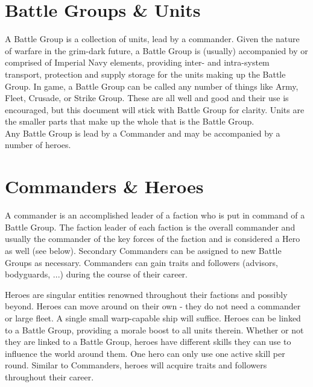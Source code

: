 \section{Battle Groups \& Units}
A Battle Group is a collection of units, lead by a commander. Given the nature of warfare in the grim-dark future, a Battle Group is (usually) accompanied by or comprised of Imperial Navy elements, providing inter- and intra-system transport, protection and supply storage for the units making up the Battle Group.  In game, a Battle Group can be called any number of things like Army, Fleet, Crusade, or Strike Group. 
These are all well and good and their use is encouraged, but this document will stick with Battle Group for clarity.
Units are the smaller parts that make up the whole that is the Battle Group. \\
Any Battle Group is lead by a Commander and may be accompanied by a number of heroes.

\section{Commanders \& Heroes}
A commander is an accomplished leader of a faction who is put in command of a Battle Group. The faction leader of each faction is the overall commander and usually the commander of the key forces of the faction and is considered a Hero as well (see below).
Secondary Commanders can be assigned to new Battle Groups as necessary. Commanders can gain traits and followers (advisors, bodyguards, ...) during the course of their career.

Heroes are singular entities renowned throughout their factions and possibly beyond. Heroes can move around on their own - they do not need a commander or large fleet. A single small warp-capable ship will suffice.
Heroes can be linked to a Battle Group, providing a morale boost to all units therein. 
Whether or not they are linked to a Battle Group, heroes have different skills they can use to influence the world around them.
One hero can only use one active skill per round.
Similar to Commanders, heroes will acquire traits and followers throughout their career.

